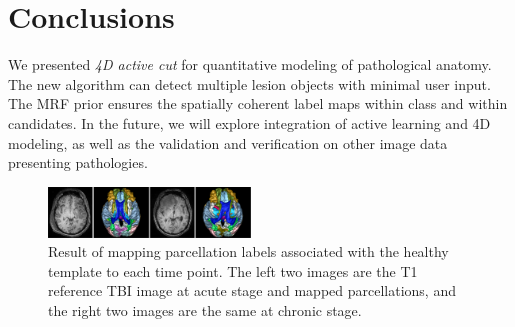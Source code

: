 \documentclass{article}
\begin{document}
\section{Conclusions}
\label{sec:conc}
We presented \emph{4D active cut} for quantitative modeling of pathological
anatomy. The new algorithm can detect multiple lesion objects with minimal user
input. The MRF prior ensures the spatially coherent label maps within class and
within candidates.  In the future, we will explore integration of active
learning and 4D modeling, as well as the validation and verification on other
image data presenting pathologies.

\begin{figure} [t]
\centering
\includegraphics[width=0.479\textwidth]{./figures/parcellation}
\caption{Result of mapping parcellation labels associated with the healthy
  template to each time point. The left two images are the T1 reference TBI image at acute stage and mapped parcellations, and the right two images are the same at chronic stage.}
\label{fig:Deform}
\end{figure}




\end{document}
